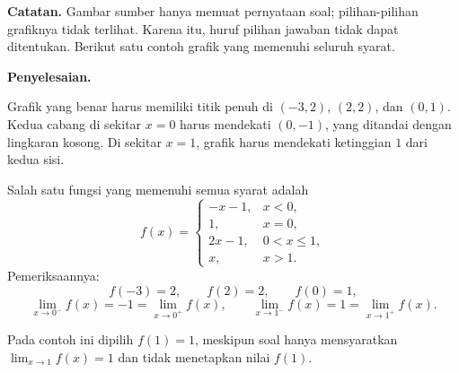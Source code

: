 \documentclass[11pt,a4paper]{article}
\newcommand{\jawab}{\par\medskip\textbf{Penyelesaian.}\par}
\newcommand{\catatan}[1]{\par\smallskip\textbf{Catatan.} #1\par}
\begin{document}
\begin{enumerate}
\catatan{Gambar sumber hanya memuat pernyataan soal; pilihan-pilihan
grafiknya tidak terlihat. Karena itu, huruf pilihan jawaban tidak dapat
ditentukan. Berikut satu contoh grafik yang memenuhi seluruh syarat.}

\jawab
Grafik yang benar harus memiliki titik penuh di $(-3,2)$, $(2,2)$, dan
$(0,1)$. Kedua cabang di sekitar $x=0$ harus mendekati $(0,-1)$, yang
ditandai dengan lingkaran kosong. Di sekitar $x=1$, grafik harus mendekati
ketinggian $1$ dari kedua sisi.

Salah satu fungsi yang memenuhi semua syarat adalah
\[
    f(x)=
    \begin{cases}
        -x-1, & x<0,\\
        1, & x=0,\\
        2x-1, & 0<x\leq 1,\\
        x, & x>1.
    \end{cases}
\]
Pemeriksaannya:
\[
    f(-3)=2,\qquad f(2)=2,\qquad f(0)=1,
\]
\[
    \lim_{x\to 0^-}f(x)=-1=\lim_{x\to 0^+}f(x),\qquad
    \lim_{x\to 1^-}f(x)=1=\lim_{x\to 1^+}f(x).
\]
\begin{center}
\end{center}
Pada contoh ini dipilih $f(1)=1$, meskipun soal hanya mensyaratkan
$\lim_{x\to 1}f(x)=1$ dan tidak menetapkan nilai $f(1)$.
\end{enumerate}

\newpage
\end{document}
